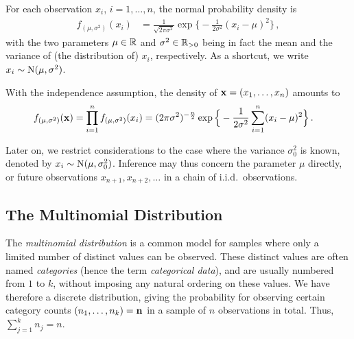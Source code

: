 For each observation $x_i$, $i=1,\ldots, n$, the normal probability density is
\begin{align*}
f_{(\mu, \sigma^2)}(x_{i}) &= \frac{1}{\sqrt{2\pi\sigma^2}}\exp\Big\{ -\frac{1}{2\sigma^2}(x_{i} - \mu)^2 \Big\}\,,
\end{align*}
with the two parameters $\mu \in \mathbb{R}$ and $\sigma^2 \in \mathbb{R}_{>0}$
being in fact the mean and the variance of (the distribution of) $x_i$, respectively.
As a shortcut, we write $x_i \sim \operatorname{N}(\mu, \sigma^2)$.

With the independence assumption, the density of $\mathbf{x} = (x_1,\ldots,x_n)$ amounts to
\begin{align}\label{eq:normaldens}
f_{(\mu, \sigma^2)}(\mathbf{x})
 &= \prod_{i=1}^n f_{(\mu, \sigma^2)}(x_{i})
  = (2\pi\sigma^2)^{-\frac{n}{2}}\exp\Big\{ -\frac{1}{2\sigma^2}\sum_{i=1}^n (x_{i} - \mu)^2 \Big\}\,.
\end{align}

Later on, we restrict considerations to the case where the variance $\sigma_0^2$ is known, denoted by $x_i \sim \operatorname{N}(\mu, \sigma_0^2)$.
Inference may thus concern the parameter $\mu$ directly, or future observations $x_{n+1}, x_{n+2}, \ldots$ in a chain of i.i.d.\ observations.


\subsection{The Multinomial Distribution}
\label{sec:multinomdist}

The \emph{multinomial distribution} is a common model for samples where only a limited number of distinct values can be observed.
These distinct values are often named \emph{categories} (hence the term \emph{categorical data}),
and are usually numbered from $1$ to $k$, without imposing any natural ordering on these values.
We have therefore a discrete distribution,
giving the probability for observing certain category counts $(n_1, \ldots, n_k) = \mathbf{n}$ in a sample of $n$ observations in total.
Thus, $\sum_{j=1}^k n_j = n$.

